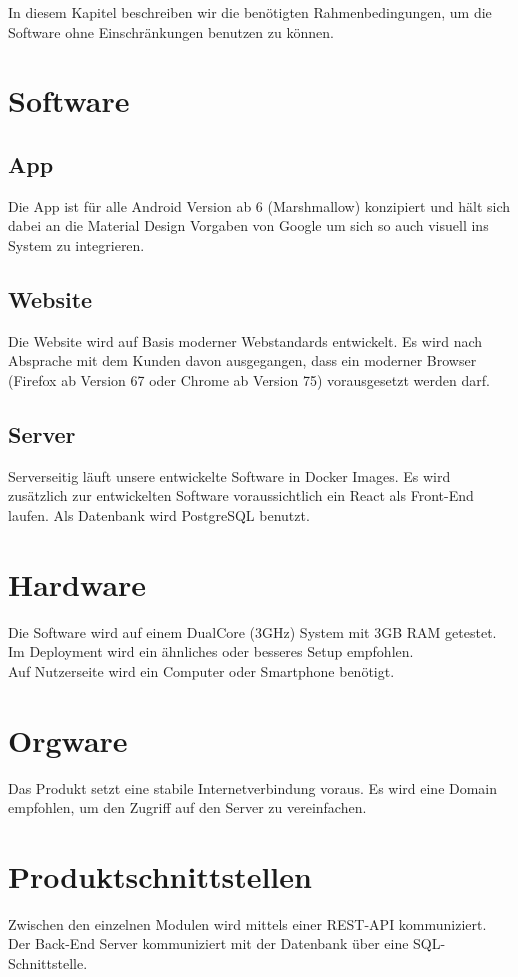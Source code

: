 In diesem Kapitel beschreiben wir die benötigten Rahmenbedingungen, um die Software ohne Einschränkungen benutzen zu können.

\section{Software}

\subsection*{App}
Die App ist für alle Android Version ab 6 (Marshmallow) konzipiert und hält sich dabei an die Material Design Vorgaben von Google um sich so auch visuell ins System zu integrieren.

\subsection*{Website}
Die Website wird auf Basis moderner Webstandards entwickelt. Es wird nach Absprache mit dem Kunden davon ausgegangen, dass ein moderner Browser (Firefox ab Version 67 oder Chrome ab Version 75) vorausgesetzt werden darf.

\subsection*{Server} 
Serverseitig läuft unsere entwickelte Software in Docker Images. Es wird zusätzlich zur entwickelten Software voraussichtlich ein React als Front-End laufen.
Als Datenbank wird PostgreSQL benutzt.

\section{Hardware}
Die Software wird auf einem DualCore (3GHz) System mit 3GB RAM getestet. Im Deployment wird ein ähnliches oder besseres Setup empfohlen.\\
Auf Nutzerseite wird ein Computer oder Smartphone benötigt. 
\section{Orgware}

Das Produkt setzt eine stabile Internetverbindung voraus. Es wird eine Domain empfohlen, um den Zugriff auf den Server zu vereinfachen.

\section{Produktschnittstellen}
Zwischen den einzelnen Modulen wird mittels einer REST-API kommuniziert. Der Back-End Server kommuniziert mit der Datenbank über eine SQL-Schnittstelle.
